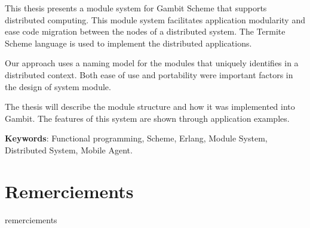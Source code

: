 \documentclass[12pt,initial,twoside,maitrise]{dms}
\numberwithin{equation}{section}
\numberwithin{table}{chapter}
\numberwithin{figure}{chapter}
\begin{document}
This thesis presents a module system for Gambit Scheme that supports
distributed computing. This module system facilitates application modularity
and ease code migration between the nodes of a distributed system. The Termite
Scheme language is used to implement the distributed applications.

Our approach uses a naming model for the modules
that uniquely identifies in a distributed
context. Both ease of use and portability were important factors
in the design of system module.

The thesis will describe the module structure and how
it was implemented into Gambit. The features of this system
are shown through application examples.

\vspace*{1.5ex}
\noindent\textbf{Keywords}: Functional programming, Scheme, Erlang,
Module System, Distributed System, Mobile Agent.


\francais
\cleardoublepage%
\tableofcontents
\cleardoublepage%
\listoftables
\cleardoublepage%
%
\listoffigures


\chapter*{Remerciements}

remerciements

\end{document}
